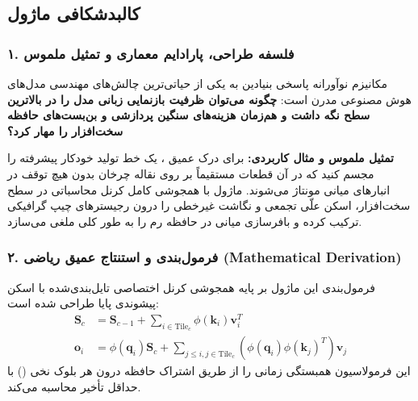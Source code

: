 \subsection{کالبدشکافی ماژول }

\subsubsection*{۱. فلسفه طراحی، پارادایم معماری و تمثیل ملموس}
مکانیزم نوآورانه  پاسخی بنیادین به یکی از حیاتی‌ترین چالش‌های مهندسی مدل‌های هوش مصنوعی مدرن است: \textbf{چگونه می‌توان ظرفیت بازنمایی زبانی مدل را در بالاترین سطح نگه داشت و هم‌زمان هزینه‌های سنگین پردازشی و بن‌بست‌های حافظه سخت‌افزار را مهار کرد؟}

\textbf{تمثیل ملموس و مثال کاربردی:}
برای درک عمیق ، یک خط تولید خودکار پیشرفته را مجسم کنید که در آن قطعات مستقیماً بر روی نقاله چرخان بدون هیچ توقف در انبارهای میانی مونتاژ می‌شوند. ماژول  با همجوشی کامل کرنل محاسباتی در سطح سخت‌افزار، اسکن علّی تجمعی و نگاشت غیرخطی را درون رجیسترهای چیپ گرافیکی ترکیب کرده و بافرسازی میانی در حافظه رم را به طور کلی ملغی می‌سازد.

\subsubsection*{۲. فرمول‌بندی و استنتاج عمیق ریاضی (Mathematical Derivation)}
فرمول‌بندی این ماژول بر پایه همجوشی کرنل اختصاصی تایل‌بندی‌شده با اسکن پیشوندی پایا طراحی شده است:
\begin{align}
\mathbf{S}_c &= \mathbf{S}_{c-1} + \sum_{i \in \text{Tile}_c} \phi(\mathbf{k}_i) \mathbf{v}_i^T \\
\mathbf{o}_i &= \phi(\mathbf{q}_i) \mathbf{S}_c + \sum_{j \le i, j \in \text{Tile}_c} (\phi(\mathbf{q}_i) \phi(\mathbf{k}_j)^T) \mathbf{v}_j
\end{align}
این فرمولاسیون همبستگی زمانی را از طریق اشتراک حافظه درون هر بلوک نخی () با حداقل تأخیر محاسبه می‌کند.

